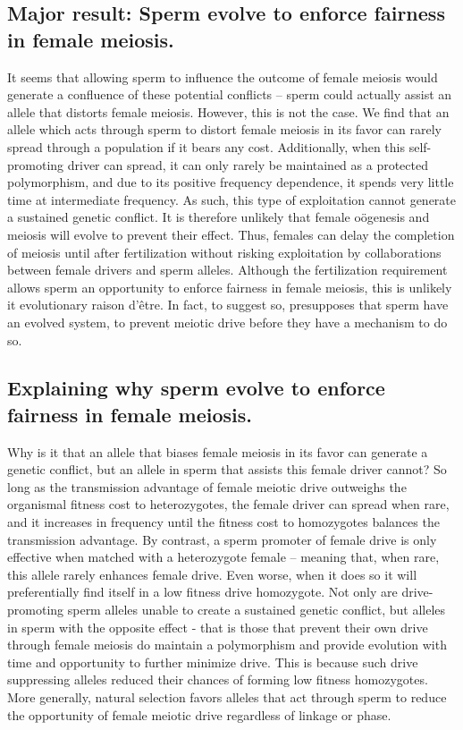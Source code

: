 \documentclass[12pt,letterpaper]{article}
\begin{document}
\subsection*{Major result: Sperm evolve to enforce fairness in female meiosis.} 
It seems that allowing sperm to influence the outcome of female meiosis would generate a confluence of these potential conflicts -- 
	sperm could actually assist an allele that distorts female meiosis.
However, this is not the case.
We find that an allele which acts through sperm to distort female meiosis in its favor %
	can rarely spread through a population if it bears any cost. 
Additionally, when this self-promoting driver can spread, it can only rarely 
	be maintained as a protected polymorphism, and due to its positive frequency dependence,  
	it spends very little time at intermediate frequency.
As such, this type of exploitation cannot generate a sustained genetic conflict.
It is therefore unlikely
	that female o\"{o}genesis and meiosis will evolve to prevent their effect.  
Thus, females can delay the completion of meiosis until after fertilization 
	without risking exploitation by collaborations between female
        drivers and sperm alleles. 
Although the fertilization requirement allows sperm an opportunity to enforce fairness in female meiosis, 
	this is unlikely it evolutionary raison d'\^{e}tre. 
In fact, to suggest so, presupposes that sperm have an evolved system, to prevent meiotic drive before they have a mechanism to do so.
\newline 

\subsection*{Explaining why sperm evolve to enforce fairness in female meiosis.} 
Why is it that an allele that biases female meiosis in its favor can
generate a genetic conflict, 
but an allele in sperm that assists this female driver cannot? 
So long as the transmission advantage of female meiotic drive outweighs 
the organismal fitness cost to heterozygotes, 
the female driver can spread when rare, and it increases in 		
	frequency until the fitness cost to homozygotes balances the transmission advantage.
By contrast, a sperm promoter of female drive is only effective when matched with a heterozygote female -- meaning that, when rare, this allele rarely enhances female drive. 
Even worse, when it does so it will preferentially find itself in a low fitness drive homozygote. 
Not only are drive-promoting sperm alleles unable to create a sustained genetic conflict, 
	but alleles in sperm with the opposite effect - that is those that prevent their own drive through female meiosis do maintain a polymorphism and 
	provide evolution  with time and opportunity to further minimize drive.
This is because such drive suppressing alleles reduced their chances
of forming low fitness homozygotes. 
More generally, natural selection favors alleles that act through sperm to
 reduce the opportunity of female meiotic drive regardless of linkage or phase. \newline 
 
\end{document}

